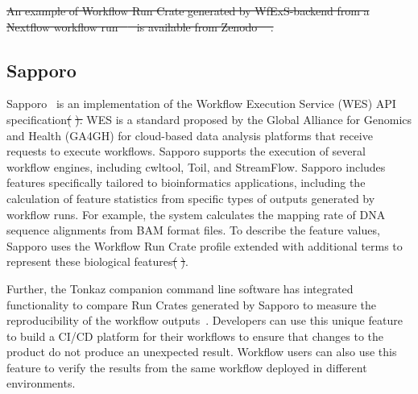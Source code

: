\documentclass[10pt,letterpaper]{article}
\providecommand{\DIFaddtex}[1]{{\protect\color{blue}\uwave{#1}}} %
\providecommand{\DIFdeltex}[1]{{\protect\color{red}\sout{#1}}}                      %
\providecommand{\DIFaddbegin}{} %
\providecommand{\DIFaddend}{} %
\providecommand{\DIFdelbegin}{} %
\providecommand{\DIFdelend}{} %
\providecommand{\DIFadd}[1]{\texorpdfstring{\DIFaddtex{#1}}{#1}} %
\providecommand{\DIFdel}[1]{\texorpdfstring{\DIFdeltex{#1}}{}} %
\newcommand{\DIFscaledelfig}{0.5}
\newlength{\DIFdelgraphicswidth} %
\newlength{\DIFdelgraphicsheight} %
\newcommand{\DIFaddincludegraphics}[2][]{{\color{blue}\fbox{\DIFOincludegraphics[#1]{#2}}}} %
\newcommand{\DIFdelincludegraphics}[2][]{%
\sbox{\DIFdelgraphicsbox}{\DIFOincludegraphics[#1]{#2}}%
\settoboxwidth{\DIFdelgraphicswidth}{\DIFdelgraphicsbox} %
\settoboxtotalheight{\DIFdelgraphicsheight}{\DIFdelgraphicsbox} %
\scalebox{\DIFscaledelfig}{%
\parbox[b]{\DIFdelgraphicswidth}{\usebox{\DIFdelgraphicsbox}\\[-\baselineskip] \rule{\DIFdelgraphicswidth}{0em}}\llap{\resizebox{\DIFdelgraphicswidth}{\DIFdelgraphicsheight}{%
\setlength{\unitlength}{\DIFdelgraphicswidth}%
\begin{picture}(1,1)%
\thicklines\linethickness{2pt} %
{\color[rgb]{1,0,0}\put(0,0){\framebox(1,1){}}}%
{\color[rgb]{1,0,0}\put(0,0){\line( 1,1){1}}}%
{\color[rgb]{1,0,0}\put(0,1){\line(1,-1){1}}}%
\end{picture}%
}\hspace*{3pt}}} %
} %
\DeclareRobustCommand{\DIFaddbegin}{\DIFOaddbegin \let\includegraphics\DIFaddincludegraphics} %
\DeclareRobustCommand{\DIFaddend}{\DIFOaddend \let\includegraphics\DIFOincludegraphics} %
\DeclareRobustCommand{\DIFdelbegin}{\DIFOdelbegin \let\includegraphics\DIFdelincludegraphics} %
\DeclareRobustCommand{\DIFdelend}{\DIFOaddend \let\includegraphics\DIFOincludegraphics} %
\begin{document}
\DIFdelbegin \DIFdel{An example of Workflow Run Crate generated by WfExS-backend from a Nextflow workflow run \mbox{%
\cite{Bouyssie 2023} }\hskip0pt%
is available from Zenodo \mbox{%
\cite{Fernandez 2023b}}\hskip0pt%
.
}%

\DIFdelend \subsection{Sapporo}\label{sapporo}

Sapporo~\cite{Suetake 2022a} is an implementation of the Workflow Execution Service (WES) API specification\DIFdelbegin \DIFdel{(}%
\DIFdel{).
}\DIFdelend \DIFaddbegin \DIFadd{~\mbox{%
\cite{Rehm 2021}}\hskip0pt%
.
}\DIFaddend WES is a standard proposed by the Global Alliance for Genomics and Health (GA4GH) for cloud-based data analysis platforms that receive requests to execute workflows.
Sapporo supports the execution of several workflow engines, including cwltool\DIFaddbegin \DIFadd{~}\DIFaddend \cite{Amstutz 2023}, Toil\DIFaddbegin \DIFadd{~}\DIFaddend \cite{Vivian 2017}, and StreamFlow\DIFaddbegin \DIFadd{~}\DIFaddend \cite{Colonnelli 2021}.
Sapporo includes features specifically tailored to bioinformatics applications, including the calculation of feature statistics from specific types of outputs generated by workflow runs.
For example, the system calculates the mapping rate of DNA sequence alignments from BAM format files.
To describe the feature values, Sapporo uses the Workflow Run Crate profile extended with additional terms to represent these biological features\DIFdelbegin \DIFdel{(}%
\DIFdel{)}\DIFdelend \DIFaddbegin \DIFadd{~\mbox{%
\cite{sapporo-terms}}\hskip0pt%
}\DIFaddend .

Further, the Tonkaz companion command line software has integrated functionality to compare Run Crates generated by Sapporo to measure the reproducibility of the workflow outputs~\cite{Suetake 2023}.
Developers can use this unique feature to build a CI/CD platform for their workflows to ensure that changes to the product do not produce an unexpected result.
Workflow users can also use this feature to verify the results from the same workflow deployed in different environments.
\end{document}
